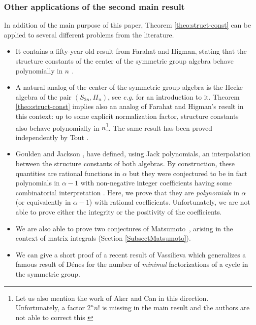 \documentclass[11pt]{amsart}
\theoremstyle{plain}
\theoremstyle{remark}
\begin{document}
\subsubsection{Other applications of the second main result}
\label{subsect:other_applications}
In addition of the main purpose of this paper,
Theorem \ref{theo:struct-const} can be applied to several different problems from the literature.
\begin{itemize}
    \item It contains a fifty-year old result from Farahat and Higman,
        stating that the structure constants of the center of the symmetric group algebra
        behave polynomially in $n$ \cite{FarahatHigmanCentreQSn}.
    \item A natural analog of the center of the symmetric group algebra
        is the Hecke algebra of the pair $(S_{2n},H_n)$,
        see {\em e.g.} \cite[Section 7.2]{Macdonald1995} for an introduction to it.
        Theorem \ref{theo:struct-const}
        implies also an analog of Farahat and Higman's result
        in this context: up to some explicit normalization factor,
        structure constants also behave polynomially in $n$\footnote{Let
        us also mention the work of Aker and Can \cite{AkerCanFarahatHecke}
        in this direction. Unfortunately, a factor $2^n n!$ is missing in the main result
        and the authors are not able to correct this \cite{CanMistake}}.
        The same result has been proved independently by Tout
        \cite{Tout-Structure-constant-S2n-Hn}.
    \item Goulden and Jackson \cite{GouldenJacksonMatchingJack},
        have defined, using Jack polynomials,
        an interpolation between the structure constants of both algebras.
        By construction, these quantities are rational functions
        in $\alpha$ but they were conjectured to be in fact
        polynomials in $\alpha-1$ with non-negative integer coefficients
        having some combinatorial interpretation
        \cite[Section 4]{GouldenJacksonMatchingJack}.
        Here, we prove that they are {\em polynomials} in $\alpha$
        (or equivalently in $\alpha-1$) with rational coefficients.
        Unfortunately, we are not able 
        to prove either the integrity
        or the positivity of the coefficients.
    \item We are also able to prove two conjectures of 
        Matsumoto~\cite[Section 9]{MatsumotoOddJM},
        arising in the context of matrix integrals (Section 
        \ref{SubsectMatsumoto}).
    \item We can give a short proof of a recent result 
of Vassilieva \cite{VassilievaJack} which generalizes 
a famous result of Dénes \cite{Denes1959} for the number of {\em minimal} factorizations
of a cycle in the symmetric group.
\end{itemize}
\end{document}
